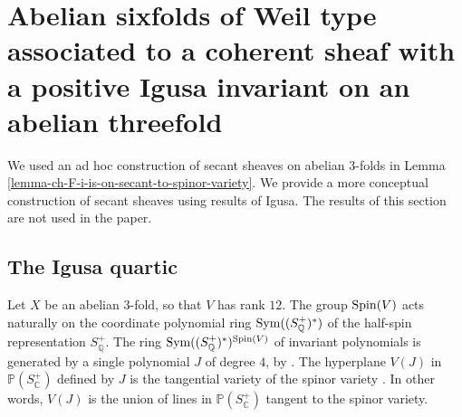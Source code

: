 \documentclass[12pt]{amsart}
\numberwithin{equation}{subsection}
\theoremstyle{plain}
\theoremstyle{definition}
\newcommand{\CC}{{\mathbb C}}
\newcommand{\QQ}{{\mathbb Q}}
\newcommand{\PP}{{\mathbb P}}
\newcommand{\Spin}{{\rm Spin}}
\newcommand{\Sym}{{\rm Sym}}
\begin{document}
% 
\section{Abelian sixfolds of Weil type associated to a coherent sheaf with a positive Igusa invariant on an abelian threefold}
\label{sec-Igusa-invariant}
We used an ad hoc construction of secant sheaves on abelian $3$-folds in Lemma \ref{lemma-ch-F-i-is-on-secant-to-spinor-variety}. We provide a more conceptual construction of secant sheaves using results of Igusa. The results of this section are not used in the paper. 

% 
\subsection{The Igusa quartic}
Let $X$ be an abelian $3$-fold, so that $V$ has rank $12$. 
\label{sec-coherent-sheaves-with-positive-Igusa-invariant}
The group $\Spin(V)$ acts naturally on the coordinate polynomial ring $\Sym((S^+_\QQ)^*)$ of the half-spin representation $S^+_\QQ$. 
The ring $\Sym((S^+_\QQ)^*)^{\Spin(V)}$ of invariant polynomials is generated by a single polynomial $J$ of degree $4$, by \cite[Prop. 3]{igusa}. The hyperplane $V(J)$ in $\PP(S^+_\CC)$ defined by $J$
is the tangential variety of the spinor variety \cite[Remark 2.1.1]{abuaf}. In other words, $V(J)$ is the union of lines in $\PP(S^+_\CC)$ tangent to the spinor variety. 
\end{document}
